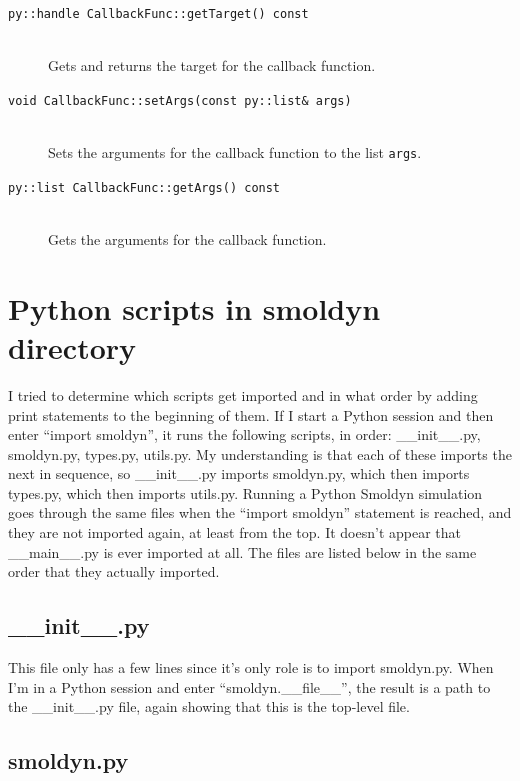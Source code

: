 \documentclass {scrbook}
\newcommand {\ttt} {\texttt}
\begin{document}
\begin{description}
\item[\ttt{py::handle CallbackFunc::getTarget() const}]
\hfill \\
Gets and returns the target for the callback function.

\item[\ttt{void CallbackFunc::setArgs(const py::list\& args)}]
\hfill \\
Sets the arguments for the callback function to the list \ttt{args}.

\item[\ttt{py::list CallbackFunc::getArgs() const}]
\hfill \\
Gets the arguments for the callback function.

\end{description}

\section{Python scripts in smoldyn directory}

I tried to determine which scripts get imported and in what order by adding print statements to the beginning of them. If I start a Python session and then enter ``import smoldyn'', it runs the following scripts, in order: \_\_init\_\_.py, smoldyn.py, types.py, utils.py. My understanding is that each of these imports the next in sequence, so \_\_init\_\_.py imports smoldyn.py, which then imports types.py, which then imports utils.py. Running a Python Smoldyn simulation goes through the same files when the ``import smoldyn'' statement is reached, and they are not imported again, at least from the top. It doesn't appear that \_\_main\_\_.py is ever imported at all. The files are listed below in the same order that they actually imported.

\subsection*{\_\_init\_\_.py}

This file only has a few lines since it's only role is to import smoldyn.py. When I'm in a Python session and enter ``smoldyn.\_\_file\_\_'', the result is a path to the \_\_init\_\_.py file, again showing that this is the top-level file.

\subsection*{smoldyn.py}
\end{document}
